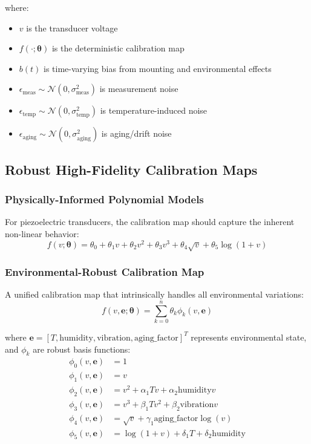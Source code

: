 \documentclass[11pt]{article}
\begin{document}
where:
\begin{itemize}
\item $v$ is the transducer voltage
\item $f(\cdot; \bm{\theta})$ is the deterministic calibration map
\item $b(t)$ is time-varying bias from mounting and environmental effects
\item $\epsilon_{\text{meas}} \sim \mathcal{N}(0,\sigma_{\text{meas}}^2)$ is measurement noise
\item $\epsilon_{\text{temp}} \sim \mathcal{N}(0,\sigma_{\text{temp}}^2)$ is temperature-induced noise
\item $\epsilon_{\text{aging}} \sim \mathcal{N}(0,\sigma_{\text{aging}}^2)$ is aging/drift noise
\end{itemize}

\subsection{Robust High-Fidelity Calibration Maps}

\subsubsection{Physically-Informed Polynomial Models}
For piezoelectric transducers, the calibration map should capture the inherent non-linear behavior:
\begin{equation}
f(v; \bm{\theta}) = \theta_0 + \theta_1 v + \theta_2 v^2 + \theta_3 v^3 + \theta_4 \sqrt{v} + \theta_5 \log(1+v)
\end{equation}

\subsubsection{Environmental-Robust Calibration Map}
A unified calibration map that intrinsically handles all environmental variations:
\begin{equation}
f(v, \mathbf{e}; \bm{\theta}) = \sum_{k=0}^{n} \theta_k \phi_k(v, \mathbf{e})
\end{equation}

where $\mathbf{e} = [T, \text{humidity}, \text{vibration}, \text{aging\_factor}]^T$ represents environmental state, and $\phi_k$ are robust basis functions:
\begin{align}
\phi_0(v, \mathbf{e}) &= 1 \\
\phi_1(v, \mathbf{e}) &= v \\
\phi_2(v, \mathbf{e}) &= v^2 + \alpha_1 T v + \alpha_2 \text{humidity} v \\
\phi_3(v, \mathbf{e}) &= v^3 + \beta_1 T v^2 + \beta_2 \text{vibration} v \\
\phi_4(v, \mathbf{e}) &= \sqrt{v} + \gamma_1 \text{aging\_factor} \log(v) \\
\phi_5(v, \mathbf{e}) &= \log(1+v) + \delta_1 T + \delta_2 \text{humidity}
\end{align}
\end{document}
